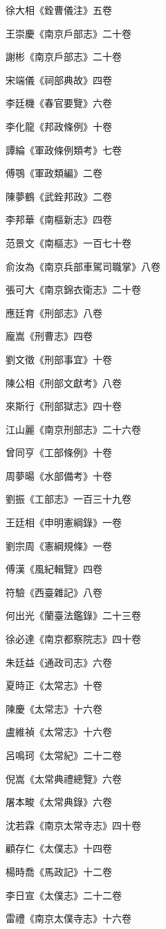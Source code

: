 徐大相《銓曹儀注》五卷

王崇慶《南京戶部志》二十卷

謝彬《南京戶部志》二十卷

宋端儀《祠部典故》四卷

李廷機《春官要覽》六卷

李化龍《邦政條例》十卷

譚綸《軍政條例類考》七卷

傅鶚《軍政類編》二卷

陳夢鶴《武銓邦政》二卷

李邦華《南樞新志》四卷

范景文《南樞志》一百七十卷

俞汝為《南京兵部車駕司職掌》八卷

張可大《南京錦衣衛志》二十卷

應廷育《刑部志》八卷

龐嵩《刑曹志》四卷

劉文徵《刑部事宜》十卷

陳公相《刑部文獻考》八卷

來斯行《刑部獄志》四十卷

江山麗《南京刑部志》二十六卷

曾同亨《工部條例》十卷

周夢暘《水部備考》十卷

劉振《工部志》一百三十九卷

王廷相《申明憲綱錄》一卷

劉宗周《憲綱規條》一卷

傅漢《風紀輯覽》四卷

符驗《西臺雜記》八卷

何出光《蘭臺法鑑錄》二十三卷

徐必達《南京都察院志》四十卷

朱廷益《通政司志》六卷

夏時正《太常志》十卷

陳慶《太常志》十六卷

盧維禎《太常志》十六卷

呂鳴珂《太常紀》二十二卷

倪嵩《太常典禮總覽》六卷

屠本畯《太常典錄》六卷

沈若霖《南京太常寺志》四十卷

顧存仁《太僕志》十四卷

楊時喬《馬政記》十二卷

李日宣《太僕志》二十二卷

雷禮《南京太僕寺志》十六卷

